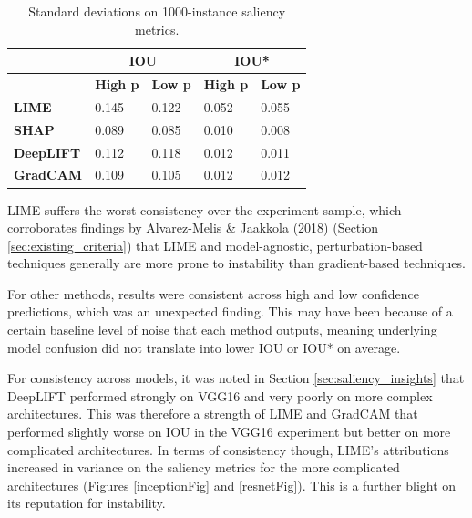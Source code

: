 \documentclass[main]{subfiles}
\begin{document}
\begin{table}[htbp]
\centering
\begin{tabular}{|l|l|l|l|l|}
\hline
                  & \multicolumn{2}{c|}{\textbf{IOU}} & \multicolumn{2}{c|}{\textbf{IOU*}} \\ \hline
                  & \textbf{High p}           & \textbf{Low p}          & \textbf{High p}           & \textbf{Low p}           \\ \hline
\textbf{LIME}     & 0.145            & 0.122          & 0.052            & 0.055           \\ \hline
\textbf{SHAP}     & 0.089            & 0.085          & 0.010            & 0.008           \\ \hline
\textbf{DeepLIFT} & 0.112            & 0.118          & 0.012            & 0.011           \\ \hline
\textbf{GradCAM}  & 0.109            & 0.105          & 0.012            & 0.012           \\ \hline
\end{tabular}

\caption{Standard deviations on 1000-instance saliency metrics.}
\label{consistencytable}

\end{table}

LIME suffers the worst consistency over the experiment sample, which corroborates findings by Alvarez-Melis \& Jaakkola (2018) (Section \ref{sec:existing_criteria}) that LIME and model-agnostic, perturbation-based techniques generally are more prone to instability than gradient-based techniques. 

For other methods, results were consistent across high and low confidence predictions, which was an unexpected finding. This may have been because of a certain baseline level of  noise that each method outputs, meaning underlying model confusion did not translate into lower IOU or IOU* on average.

For consistency across models, it was noted in Section \ref{sec:saliency_insights} that DeepLIFT performed strongly on VGG16 and very poorly on more complex architectures. This was therefore a strength of LIME and GradCAM that performed slightly worse on IOU in the VGG16 experiment but better on more complicated architectures. In terms of consistency though, LIME's attributions increased in variance on the saliency metrics for the more complicated architectures (Figures \ref{inceptionFig} and \ref{resnetFig}). This is a further blight on its reputation for instability.
\end{document}
